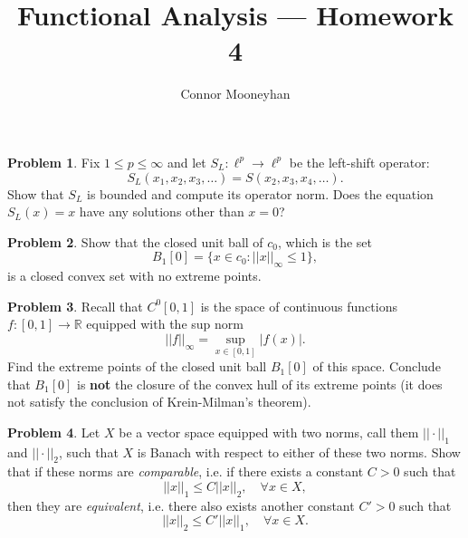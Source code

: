 \documentclass[12pt]{article}
\title{Functional Analysis --- Homework 4}
\author{Connor Mooneyhan}
\date{}
\theoremstyle{definition}
\newtheorem{ex}{Problem}
\begin{document}
\maketitle

\begin{ex}
	Fix $1 \leq p \leq \infty$ and let $S_L: \ell^p \to \ell^p$ be the left-shift operator: \begin{equation*}
		S_L(x_1, x_2, x_3, \dots) = S(x_2, x_3, x_4, \dots).
	\end{equation*}
	Show that $S_L$ is bounded and compute its operator norm.
	Does the equation $S_L(x) = x$ have any solutions other than $x = 0$?
\end{ex}

\begin{ex}
	Show that the closed unit ball of $c_0$, which is the set \begin{equation*}
		B_1[0] = \lbrace x \in c_0 : ||x||_\infty \leq 1 \rbrace,
	\end{equation*}
	is a closed convex set with no extreme points.
\end{ex}

\begin{ex}
	Recall that $C^0[0, 1]$ is the space of continuous functions $f : [0, 1] \to \mathbb{R}$ equipped with the sup norm \begin{equation*}
		||f||_\infty = \sup_{x \in [0, 1]}|f(x)|.
	\end{equation*}
	Find the extreme points of the closed unit ball $B_1[0]$ of this space.
	Conclude that $B_1[0]$ is \textbf{not} the closure of the convex hull of its extreme points (it does not satisfy the conclusion of Krein-Milman's theorem).
\end{ex}

\begin{ex}
	Let $X$ be a vector space equipped with two norms, call them $|| \cdot ||_1$ and $||\cdot||_2$, such that $X$ is Banach with respect to either of these two norms.
	Show that if these norms are \textit{comparable}, i.e. if there exists a constant $C > 0$ such that \begin{equation*}
		||x||_1 \leq C||x||_2, \hspace{1em} \forall x \in X,
	\end{equation*}
	then they are \textit{equivalent}, i.e. there also exists another constant $C' > 0$ such that \begin{equation*}
		||x||_2 \leq C'||x||_1, \hspace{1em} \forall x \in X.
	\end{equation*}
\end{ex}
\end{document}
